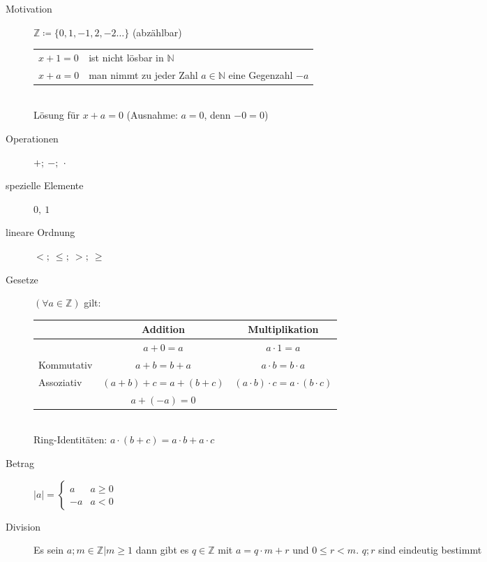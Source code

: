 \begin{description}
    \item[Motivation] $\mathbb{Z} \coloneqq \lbrace 0, 1, -1, 2, -2 \dots \rbrace$ (abzählbar)\\
    \begin{tabular}[t]{ll}
        $x+1=0$ & ist nicht lösbar in $\mathbb{N}$                               \\
        $x+a=0$ & man nimmt zu jeder Zahl $a \in \mathbb{N}$ eine Gegenzahl $-a$
    \end{tabular} \\
    Lösung für $x+a=0$ (Ausnahme: $a=0$, denn $-0=0$)
    \item[Operationen] $+; \ -; \ \cdot$
    \item[spezielle Elemente] $0,\ 1$
    \item[lineare Ordnung] $<;\ \leq;\ >;\ \geq$
    \item[Gesetze] $(\forall a \in \mathbb{Z})$ gilt: \\
    \begin{tabular}{l|c|c}
        & Addition            & Multiplikation                              \\ \hline
        & $a+0 = a$           & $a \cdot 1 = a$                             \\ \hline
        Kommutativ & $a+b = b+a$         & $a \cdot b = b \cdot a $                    \\ \hline
        Assoziativ & $(a+b)+c = a+(b+c)$ & $(a \cdot b) \cdot c = a \cdot (b \cdot c)$ \\ \hline
        & $a+(-a) = 0$
    \end{tabular} \\
    Ring-Identitäten: $a \cdot (b + c) = a \cdot b + a \cdot c$
    \item[Betrag] $|a| = \left\lbrace \begin{array}{rc} a & a \geq 0 \\ -a & a < 0\end{array} \right.$
    \item[Division] Es sein $a;m \in \mathbb{Z}|m \geq 1$ dann gibt es $q \in \mathbb{Z}$ mit $a=q \cdot m + r$ und $0 \leq r < m$. $q;r$ sind eindeutig bestimmt
\end{description}